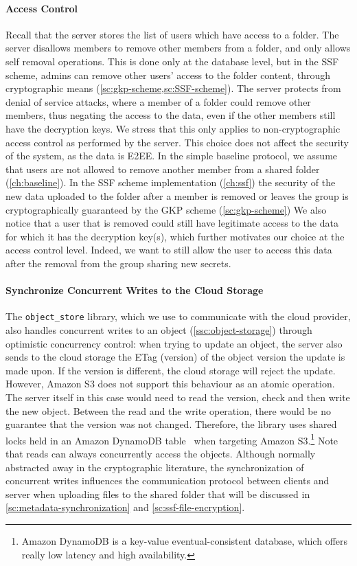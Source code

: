 \paragraph{Access Control}
Recall that the server stores the list of users which have access to
a folder. The server disallows members to remove other
members from a folder, and only allows self removal operations.
This is done only at the database level, but
in the SSF scheme, admins can remove other users'
access to the folder content, through cryptographic means
(\cref{sc:gkp-scheme,sc:SSF-scheme}).
The server protects from denial of service attacks,
where a member of a folder could remove other members,
thus negating the access to the data, even if the other
members still have the decryption keys.
We stress that this only applies to non-cryptographic
access control as performed
by the server.
This choice does not affect the security of the system,
as the data is E2EE.
In the simple baseline protocol,
we assume that users are not allowed to
remove another member from a shared folder (\cref{ch:baseline}).
In the SSF scheme implementation (\cref{ch:ssf})
the security of the new data uploaded to the folder
after a member is removed or leaves the group
is cryptographically guaranteed by the GKP scheme (\cref{sc:gkp-scheme})
We also notice that a user that is removed could still
have legitimate access to the data for which
it has the decryption key(s), which further motivates
our choice at the access control level. Indeed, we want
to still allow the user to access this data after the removal
from the group sharing new secrets.


\paragraph{Synchronize Concurrent Writes to the Cloud Storage}\label{sc:ssf-file-changes-sync}
The \texttt{object\_store} library, which
we use to communicate with the cloud provider,
also handles concurrent writes
to an object (\cref{ssc:object-storage})
through optimistic concurrency control:
when trying to update an object,
the server also sends to the cloud storage the
ETag (version)
of the object version the update is made upon.
If the version is different, 
the cloud storage will reject the update.
However, Amazon S3 does not support this 
behaviour as an atomic operation. 
The server itself in this case would need to read the version,
check and then write the new object.
Between the read and the write operation,
there would be no guarantee that the version was not changed.
Therefore, the library uses shared locks held in an Amazon DynamoDB 
table~\cite{objectStoreCommitProtocol} when targeting Amazon S3.\footnote{Amazon DynamoDB is a key-value eventual-consistent database, which offers really low latency and high availability.}
Note that reads can always concurrently access the objects. 
Although normally abstracted away in the cryptographic
literature, the synchronization of concurrent writes
influences the communication protocol
between clients and server when uploading
files to the shared folder 
that will be discussed in
\cref{sc:metadata-synchronization}
and \cref{sc:ssf-file-encryption}.

